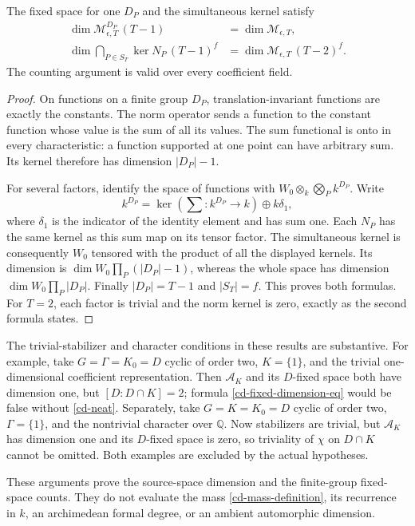 \begin{proposition}\label{cd-norm-kernel-dimensions}
The fixed space for one $D_P$ and the simultaneous kernel satisfy
\begin{align}
       \dim\mathcal M_{\epsilon,T}^{D_P}\,(T-1)
                         &=\dim\mathcal M_{\epsilon,T},
                                      \label{cd-one-fixed}\\
       \dim\bigcap_{P\in S_T}\ker N_P\,(T-1)^f
                         &=\dim\mathcal M_{\epsilon,T}\,(T-2)^f.
                                      \label{cd-all-kernels}
\end{align}
The counting argument is valid over every coefficient field.
\end{proposition}
\begin{proof}
On functions on a finite group $D_P$, translation-invariant
functions are exactly the constants. The norm operator sends
a function to the constant function whose value is the sum
of all its values. The sum functional is onto in every
characteristic: a function supported at one point can have
arbitrary sum. Its kernel therefore has dimension $|D_P|-1$.

For several factors, identify the space of functions with
$W_0\otimes_k\bigotimes_P k^{D_P}$. Write
\[
 k^{D_P}=\ker\left(\sum:k^{D_P}\to k\right)\oplus k\delta_1,
\]
where $\delta_1$ is the indicator of the identity element and
has sum one. Each $N_P$ has the same kernel as this sum map
on its tensor factor. The simultaneous kernel is consequently
$W_0$ tensored with the product of all the displayed kernels.
Its dimension is $\dim W_0\prod_P(|D_P|-1)$, whereas the whole
space has dimension $\dim W_0\prod_P|D_P|$.
Finally $|D_P|=T-1$ and $|S_T|=f$. This proves both formulas.
For $T=2$, each factor is trivial and the norm kernel is zero,
exactly as the second formula states.
\end{proof}

The trivial-stabilizer and character conditions in these results
are substantive. For example, take $G=\Gamma=K_0=D$ cyclic of
order two, $K=\{1\}$, and the trivial one-dimensional coefficient
representation. Then $\mathcal A_K$ and its $D$-fixed space both
have dimension one, but $[D:D\cap K]=2$; formula
\eqref{cd-fixed-dimension-eq} would be false without
\eqref{cd-neat}. Separately, take $G=K=K_0=D$ cyclic of order
two, $\Gamma=\{1\}$, and the nontrivial character over
$\mathbb Q$. Now stabilizers are trivial, but $\mathcal A_K$
has dimension one and its $D$-fixed space is zero, so triviality
of $\chi$ on $D\cap K$ cannot be omitted. Both examples are
excluded by the actual hypotheses.

These arguments prove the source-space dimension and the
finite-group fixed-space counts. They do not evaluate the mass
\eqref{cd-mass-definition}, its recurrence in $k$, an
archimedean formal degree, or an ambient automorphic dimension.


